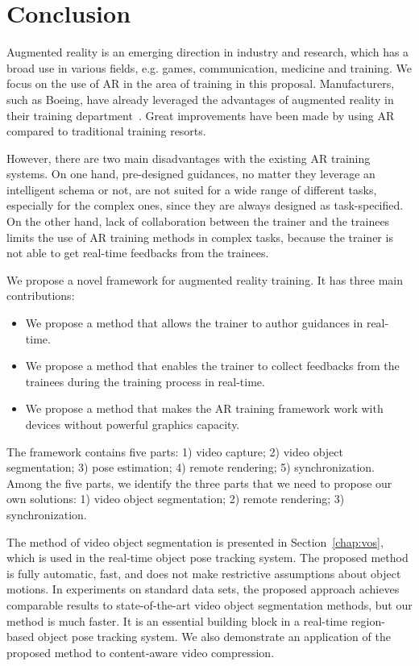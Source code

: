 \chapter{Conclusion}
\label{chap:c}

Augmented reality is an emerging direction in industry and research, which has a broad use in various fields, e.g. games, communication, medicine and training. We focus on the use of AR in the area of training in this proposal. Manufacturers, such as Boeing, have already leveraged the advantages of augmented reality in their training department~\cite{caudell1992}. Great improvements have been made by using AR compared to traditional training resorts.

However, there are two main disadvantages with the existing AR training systems.
On one hand, pre-designed guidances, no matter they leverage an intelligent schema or not, are not suited for a wide range of different tasks, especially for the complex ones, since they are always designed as task-specified.
On the other hand, lack of collaboration between the trainer and the trainees limits the use of AR training methods in complex tasks, because the trainer is not able to get real-time feedbacks from the trainees.

We propose a novel framework for augmented reality training.
It has three main contributions:
\begin{itemize}
  \item
  We propose a method that allows the trainer to author guidances in real-time.
  \item
  We propose a method that enables the trainer to collect feedbacks from the trainees during the training process in real-time.
  \item
  We propose a method that makes the AR training framework work with devices without powerful graphics capacity.
\end{itemize}

The framework contains five parts: 1) video capture; 2) video object segmentation; 3) pose estimation; 4) remote rendering; 5) synchronization.
Among the five parts, we identify the three parts that we need to propose our own solutions: 1) video object segmentation; 2) remote rendering; 3) synchronization.

The method of video object segmentation is presented in Section~\ref{chap:vos}, which is used in the real-time object pose tracking system.
The proposed method is fully automatic, fast, and does not make restrictive assumptions about object motions.
In experiments on standard data sets, the proposed approach achieves comparable results to state-of-the-art video object segmentation methods, but our method is much faster.
It is an essential building block in a real-time region-based object pose tracking system.
We also demonstrate an application of the proposed method to content-aware video compression.


